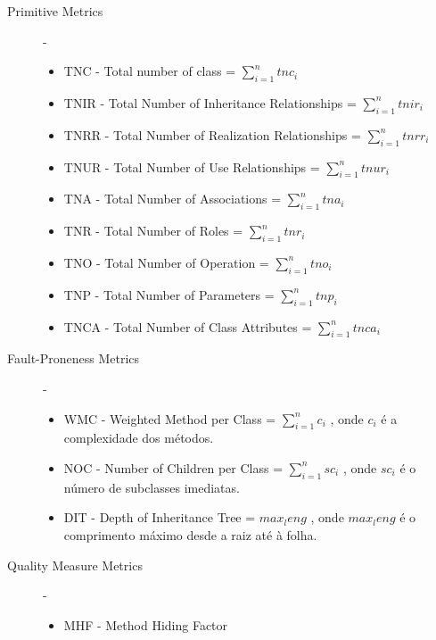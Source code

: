 \begin{description}
 \item [Primitive Metrics] - \begin{itemize}
				\item TNC - Total number of class  = $ \sum_{i=1}^{n} tnc_i $
				\item TNIR - Total Number of Inheritance Relationships  = $ \sum_{i=1}^{n} tnir_i $
				\item TNRR - Total Number of Realization Relationships  = $ \sum_{i=1}^{n} tnrr_i $
				\item TNUR - Total Number of Use Relationships  = $ \sum_{i=1}^{n} tnur_i $
				\item TNA - Total Number of Associations  = $ \sum_{i=1}^{n} tna_i $
				\item TNR - Total Number of Roles  = $ \sum_{i=1}^{n} tnr_i $
				\item TNO - Total Number of Operation  = $ \sum_{i=1}^{n} tno_i $
				\item TNP - Total Number of Parameters  = $ \sum_{i=1}^{n} tnp_i $
				\item TNCA - Total Number of Class Attributes  = $ \sum_{i=1}^{n} tnca_i $
			    \end{itemize}
 \item [Fault-Proneness Metrics] - \begin{itemize}
                                   \item WMC - Weighted Method per Class  = $ \sum_{i=1}^{n} c_i $ , onde $c_i$ é a complexidade dos métodos.
				   \item NOC - Number of Children per Class = $ \sum_{i=1}^{n} sc_i $ , onde $sc_i$ é o número de subclasses imediatas.
				   \item DIT - Depth of Inheritance Tree  = $ max_leng $ , onde $ max_leng $ é o comprimento máximo desde a raiz até à folha.
                                  \end{itemize}
 \item [Quality Measure Metrics] - \begin{itemize}
                                   \item MHF - Method Hiding Factor 
                                  \end{itemize}


  
\end{description}